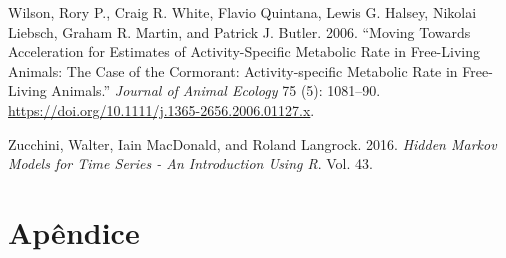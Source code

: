 \documentclass[msc,numbers,hidelinks]{coppe}
\newlength{\cslhangindent}
\newenvironment{CSLReferences}[2] %
 {%
  \setlength{\parindent}{0pt}
  \ifodd #1 \everypar{\setlength{\hangindent}{\cslhangindent}}\ignorespaces\fi
  \ifnum #2 > 0
  \setlength{\parskip}{#2\baselineskip}
  \fi
 }%
 {}
\begin{document}
\begin{CSLReferences}{1}{0}
  \leavevmode{}%
  Wilson, Rory P., Craig R. White, Flavio Quintana, Lewis G. Halsey, Nikolai Liebsch, Graham R. Martin, and Patrick J. Butler. 2006. {``Moving Towards Acceleration for Estimates of Activity-Specific Metabolic Rate in Free-Living Animals: The Case of the Cormorant: {Activity-specific} Metabolic Rate in Free-Living Animals.''} \emph{Journal of Animal Ecology} 75 (5): 1081--90. \url{https://doi.org/10.1111/j.1365-2656.2006.01127.x}.

  \leavevmode{}%
  Zucchini, Walter, Iain MacDonald, and Roland Langrock. 2016. \emph{Hidden Markov Models for Time Series - An Introduction Using R}. Vol. 43.

  \end{CSLReferences}
  \appendix

  \hypertarget{apuxeandice}{%
  \chapter*{Apêndice}\label{apuxeandice}}
\end{document}
